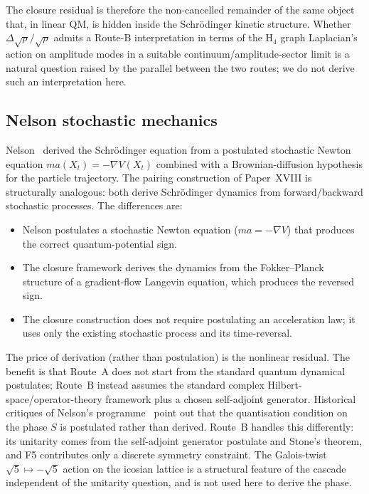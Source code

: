 \documentclass[12pt]{article}
\begin{document}
The closure residual is therefore the non-cancelled remainder of the same object that, in linear QM, is hidden inside the Schr\"odinger kinetic structure. Whether $\Delta\sqrt\rho/\sqrt\rho$ admits a Route-B interpretation in terms of the H${}_4$ graph Laplacian's action on amplitude modes in a suitable continuum/amplitude-sector limit is a natural question raised by the parallel between the two routes; we do not derive such an interpretation here.

\subsection{Nelson stochastic mechanics}

Nelson~\citep{Nelson1966,Nelson1985} derived the Schr\"odinger equation from a postulated stochastic Newton equation $ma(X_t) = -\nabla V(X_t)$ combined with a Brownian-diffusion hypothesis for the particle trajectory. The pairing construction of Paper~XVIII is structurally analogous: both derive Schr\"odinger dynamics from forward/backward stochastic processes. The differences are:
\begin{itemize}
    \item Nelson postulates a stochastic Newton equation ($ma = -\nabla V$) that produces the correct quantum-potential sign.
    \item The closure framework derives the dynamics from the Fokker--Planck structure of a gradient-flow Langevin equation, which produces the reversed sign.
    \item The closure construction does not require postulating an acceleration law; it uses only the existing stochastic process and its time-reversal.
\end{itemize}

The price of derivation (rather than postulation) is the nonlinear residual. The benefit is that Route~A does not start from the standard quantum dynamical postulates; Route~B instead assumes the standard complex Hilbert-space/operator-theory framework plus a chosen self-adjoint generator. Historical critiques of Nelson's programme~\citep{Wallstrom1994} point out that the quantisation condition on the phase $S$ is postulated rather than derived. Route~B handles this differently: its unitarity comes from the self-adjoint generator postulate and Stone's theorem, and F5 contributes only a discrete symmetry constraint. The Galois-twist $\sqrt{5} \mapsto -\sqrt{5}$ action on the icosian lattice is a structural feature of the cascade independent of the unitarity question, and is not used here to derive the phase.
\end{document}
